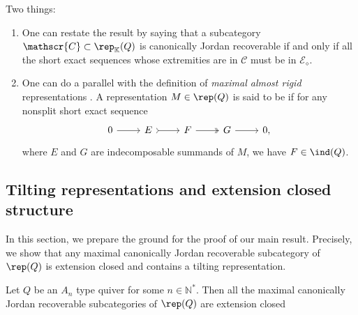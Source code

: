 \begin{remark}\label{rem:TwoThings} Two things:
\begin{enumerate}[label=$\bullet$,itemsep=1mm]
    \item One can restate the result by saying that a subcategory $\mathscr{C} \subset \rep_\mathbb{K}(Q)$ is canonically Jordan recoverable if and only if all the short exact sequences whose extremities are in $\mathscr{C}$ must be in $\mathcal{E}_\diamond$.
    \item One can do a parallel with the definition of \emph{maximal almost rigid} representations \cite{BGMS23}. A representation $M \in \rep(Q)$ is said to be  if for any nonsplit short exact sequence \[\begin{tikzcd}
	0 & E & F  & G &  0,
	\arrow[from=1-1, to=1-2]
	\arrow[tail, from=1-2, to=1-3]
	\arrow[two heads,from=1-3, to=1-4]
	\arrow[from=1-4, to=1-5]
\end{tikzcd}\] where $E$ and $G$ are indecomposable summands of $M$, we have $F \in \ind(Q)$.
\end{enumerate}
\end{remark}

\subsection{Tilting representations and extension closed structure}
\label{ss:tiltandextclosedmaxCJR}
In this section, we prepare the ground for the proof of our main result. Precisely, we show that any maximal canonically Jordan recoverable subcategory of $\rep(Q)$ is extension closed and contains a tilting representation.

\begin{prop} \label{prop:maxCJRextclos}
    Let $Q$ be an $A_n$ type quiver for some $n \in \mathbb{N}^*$. Then all the maximal canonically Jordan recoverable subcategories of $\rep(Q)$ are extension closed
\end{prop}

